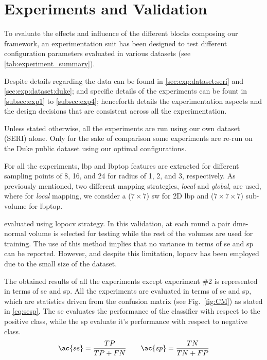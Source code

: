
\section{Experiments and Validation}
\label{sec:exp} \label{sec:exp:datasets}

To evaluate the effects and influence of the different blocks composing our framework, an experimentation suit has been designed to test different configuration parameters evaluated in various datasets (see \cref{tab:experiment_summary}).
\begin{changebar}
Despite details regarding the data can be found in \cref{sec:exp:dataset:seri} and \cref{sec:exp:dataset:duke}; and specific details of the experiments can be fount in \cref{subsec:exp1} to \cref{subsec:exp4}; henceforth details the experimentation aspects and the design decisions that are consistent across all the experimentation.
\end{changebar}

Unless stated otherwise, all the experiments are run using our own dataset (SERI) alone.
Only for the sake of comparison some experiments are re-run on the Duke public dataset using our optimal configurations.

For all the experiments, \ac{lbp} and \ac{lbptop} features are extracted for different sampling points of 8, 16, and 24 for radius of 1, 2, and 3, respectively.
As previously mentioned, two different mapping strategies, \emph{local} and \emph{global}, are used, where for \emph{local} mapping, we consider a ($7 \times 7$) \acf{sw} for 2D \ac{lbp} and ($ 7 \times 7 \times 7$) sub-volume for \ac{lbptop}.

 evaluated using \ac{lopocv} strategy.
In this validation, at each round a pair \ac{dme}-normal volume is selected for testing while the rest of the volumes are used for training.
The use of this method implies that no variance in terms of \ac{se} and \ac{sp} can be reported.
However, and despite this limitation, \ac{lopocv} has been employed due to the small size of the dataset.

The obtained results of all the experiments except experiment \#2 is represented in terms of \ac{se} and \ac{sp}.
All the experiments are evaluated in terms of \ac{se} and \ac{sp}, which are statistics driven from the confusion matrix (see Fig.~\ref{fig:CM}) as stated in \cref{eq:sesp}.
The \ac{se} evaluates the performance of the classifier with respect to the positive class, while the \ac{sp} evaluate it's performance with respect to negative class.
\begin{align}
 \ac{se}  = \frac{TP}{TP+FN} \qquad \ac{sp} = \frac{TN}{TN+FP}
 \label{eq:sesp}
\end{align}


